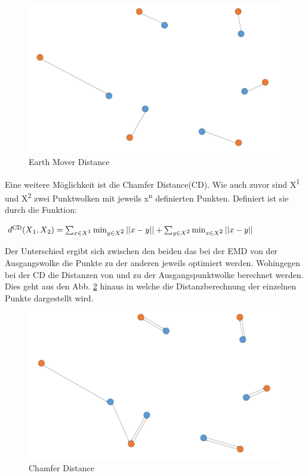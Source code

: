 \documentclass{llncs}
\begin{document}
\begin{figure}[htbp] 
	\centering
	\includegraphics[width=1.0\textwidth]{emd.png}
	\caption{Earth Mover Distance}
	\label{fig:Bild9}
\end{figure}
		
Eine weitere Möglichkeit ist die Chamfer Distance(CD). Wie auch zuvor sind  X\textsuperscript{1} und X\textsuperscript{2} zwei Punktwolken mit jeweils x\textsuperscript{n} definierten Punkten\cite{autoencoderloss}. Definiert ist sie durch die Funktion:

\begin{math}
d\textsuperscript{CD}(X\textsubscript{1},X\textsubscript{2})=\sum_{x\in X\textsuperscript{1}} \min_{y \in X\textsuperscript{2}}||x-y|| + \sum_{y\in X\textsuperscript{2}} \min_{x \in X\textsuperscript{2}}||x-y||
\end{math}

Der Unterschied ergibt sich zwischen den beiden das bei der EMD von der Ausgangswolke die Punkte zu der anderen jeweils optimiert werden. Wohingegen bei der CD die Distanzen von und zu der Ausgangspunktwolke berechnet werden. Dies geht aus den Abb. \ref{fig:Bild10} hinaus in welche die Distanzberechnung der einzelnen Punkte dargestellt wird\cite{autoencoderloss}.

\begin{figure}[htbp] 
	\centering
	\includegraphics[width=1.0\textwidth]{chamfer.png}
	\caption{Chamfer Distance}
	\label{fig:Bild10}
\end{figure} 
\end{document}
